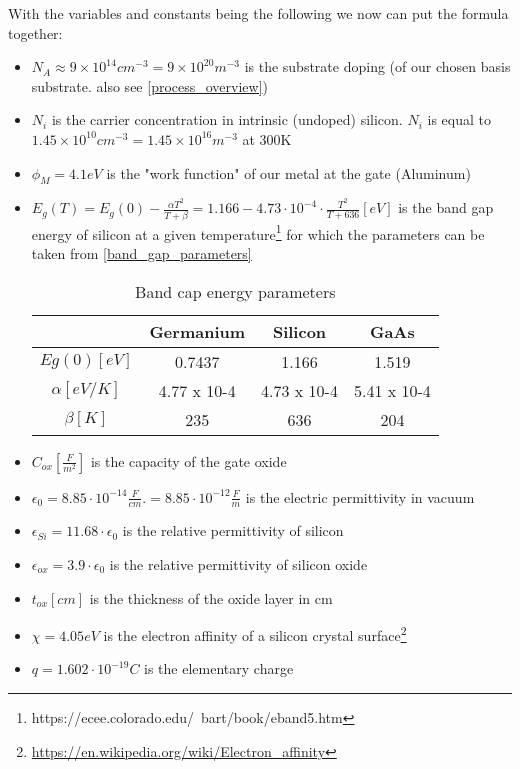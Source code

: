 With the variables and constants being the following we now can put the formula together:
\begin{itemize}
\item $N_A \approx 9\times10^{14}cm^{-3} = 9\times10^{20}m^{-3}$ is the substrate doping (of our chosen basis substrate. also see \autoref{process_overview})
\item $N_i$ is the carrier concentration in intrinsic (undoped) silicon. $N_i$ is equal to $1.45 \times 10^{10} cm^{-3} = 1.45 \times 10^{16} m^{-3}$ at 300\degree K
\item $\phi_M = 4.1 eV$ is the "work function" of our metal at the gate (Aluminum)
\item $E_g(T) = E_g(0) - \frac{\alpha T^2}{T+\beta} = 1.166 - 4.73 \cdot 10^{-4} \cdot \frac{T^2}{T+636} [eV]$ is the band gap energy of silicon at a given temperature\footnote{https://ecee.colorado.edu/~bart/book/eband5.htm} for which the parameters can be taken from \autoref{band_gap_parameters}
\begin{table}[H]
\centering
\begin{tabular}{|c|c|c|c|}
\hline
{} &
\textbf{Germanium} &
\textbf{Silicon} &
\textbf{GaAs} \\
\hline
$Eg(0) [eV]$ &
0.7437 &
1.166 &
1.519 \\
\hline
$\alpha [eV/K]$ &
4.77 x 10-4 &
4.73 x 10-4 &
5.41 x 10-4 \\
\hline
$\beta [K]$ &
235 &
636 &
204 \\
\hline
\end{tabular}
\caption{Band cap energy parameters}
\label{band_gap_parameters}
\end{table}
\item $C_{ox} \left[\frac{F}{m^2}\right]$ is the capacity of the gate oxide
\item $\epsilon_0 = 8.85 \cdot 10^{-14} \frac{F}{cm}.= 8.85 \cdot 10^{-12} \frac{F}{m} $ is the electric permittivity in vacuum
\item $\epsilon_{Si} =11.68 \cdot \epsilon_0$ is the relative permittivity of silicon
\item $\epsilon_{ox} = 3.9 \cdot \epsilon_0$ is the relative permittivity of silicon oxide
\item $t_{ox} [cm]$ is the thickness of the oxide layer in cm
\item $\chi = 4.05 eV$ is the electron affinity of a silicon crystal surface\footnote{\url{https://en.wikipedia.org/wiki/Electron_affinity}}
\item $q=1.602 \cdot 10^{-19} C$ is the elementary charge
\end{itemize} 
 
